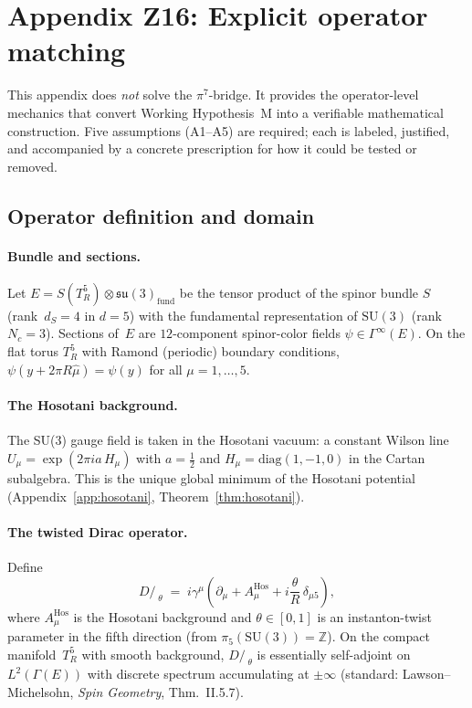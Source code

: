 
\section{Appendix Z16: Explicit operator matching}
\label{app:operator_matching}

This appendix does \emph{not} solve the $\pi^7$-bridge.  It provides
the operator-level mechanics that convert Working Hypothesis~M into a
verifiable mathematical construction. Five assumptions (A1--A5) are
required; each is labeled, justified, and accompanied by a concrete
prescription for how it could be tested or removed.

\subsection{Operator definition and domain}
\label{sec:Z16_operators}

\paragraph{Bundle and sections.}
Let $E = S(T^5_R)\otimes\mathfrak{su}(3)_{\mathrm{fund}}$ be the
tensor product of the spinor bundle $S$ (rank~$d_S=4$ in $d=5$) with
the fundamental representation of $\mathrm{SU}(3)$ (rank~$N_c=3$).
Sections of~$E$ are $12$-component spinor-color fields
$\psi\in\Gamma^\infty(E)$. On the flat torus $T^5_R$ with Ramond
(periodic) boundary conditions, $\psi(y+2\pi R\hat\mu)=\psi(y)$ for
all $\mu=1,\ldots,5$.

\paragraph{The Hosotani background.}
The SU(3) gauge field is taken in the Hosotani vacuum: a constant
Wilson line $U_\mu=\exp(2\pi i a\,H_\mu)$ with $a=\tfrac12$ and
$H_\mu=\mathrm{diag}(1,-1,0)$ in the Cartan subalgebra.
This is the unique global minimum of the Hosotani potential
(Appendix~\ref{app:hosotani}, Theorem~\ref{thm:hosotani}).

\paragraph{The twisted Dirac operator.}
Define
\begin{equation}\label{eq:Z16_dirac}
  D\!\!\!\!/_{\;\theta}
  \;=\; i\gamma^\mu\!\left(\partial_\mu + A_\mu^{\mathrm{Hos}}
    + i\frac{\theta}{R}\,\delta_{\mu 5}\right),
\end{equation}
where $A_\mu^{\mathrm{Hos}}$ is the Hosotani background and
$\theta\in[0,1]$ is an instanton-twist parameter in the fifth
direction (from $\pi_5(\mathrm{SU}(3))=\mathbb{Z}$).  On the
compact manifold~$T^5_R$ with smooth background,
$D\!\!\!\!/_{\;\theta}$ is essentially self-adjoint on
$L^2(\Gamma(E))$ with discrete spectrum accumulating at $\pm\infty$
(standard: Lawson--Michelsohn, \emph{Spin Geometry}, Thm.~II.5.7).


